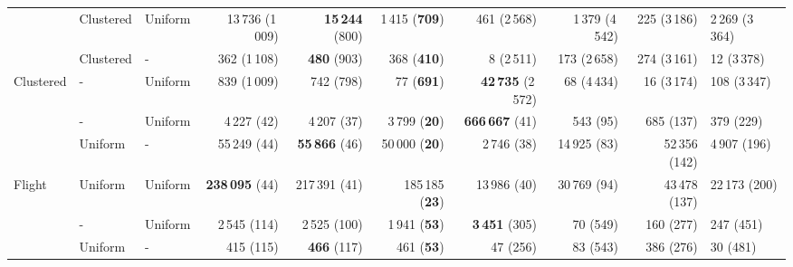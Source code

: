 \begin{tabular}[t]{lllrrrrrrl}
 & Clustered & Uniform & 13\,736 {\footnotesize(1\,009)} & \textbf{15\,244} {\footnotesize(800)} & 1\,415 {\footnotesize(\textbf{709})} & 461 {\footnotesize(2\,568)} & 1\,379 {\footnotesize(4\,542)} & 225 {\footnotesize(3\,186)} & 2\,269 {\footnotesize(3\,364)}\\

 & Clustered & - & 362 {\footnotesize(1\,108)} & \textbf{480} {\footnotesize(903)} & 368 {\footnotesize(\textbf{410})} & 8 {\footnotesize(2\,511)} & 173 {\footnotesize(2\,658)} & 274 {\footnotesize(3\,161)} & 12 {\footnotesize(3\,378)}\\

\multirow{-5}{*}{\raggedright\arraybackslash Clustered} & - & Uniform & 839 {\footnotesize(1\,009)} & 742 {\footnotesize(798)} & 77 {\footnotesize(\textbf{691})} & \textbf{42\,735} {\footnotesize(2\,572)} & 68 {\footnotesize(4\,434)} & 16 {\footnotesize(3\,174)} & 108 {\footnotesize(3\,347)}\\
\cmidrule{1-10}
 & - & Uniform & 4\,227 {\footnotesize(42)} & 4\,207 {\footnotesize(37)} & 3\,799 {\footnotesize(\textbf{20})} & \textbf{666\,667} {\footnotesize(41)} & 543 {\footnotesize(95)} & 685 {\footnotesize(137)} & 379 {\footnotesize(229)}\\

 & Uniform & - & 55\,249 {\footnotesize(44)} & \textbf{55\,866} {\footnotesize(46)} & 50\,000 {\footnotesize(\textbf{20})} & 2\,746 {\footnotesize(38)} & 14\,925 {\footnotesize(83)} & 52\,356 {\footnotesize(142)} & 4\,907 {\footnotesize(196)}\\

\multirow{-3}{*}{\raggedright\arraybackslash Flight} & Uniform & Uniform & \textbf{238\,095} {\footnotesize(44)} & 217\,391 {\footnotesize(41)} & 185\,185 {\footnotesize(\textbf{23})} & 13\,986 {\footnotesize(40)} & 30\,769 {\footnotesize(94)} & 43\,478 {\footnotesize(137)} & 22\,173 {\footnotesize(200)}\\
\cmidrule{1-10}
 & - & Uniform & 2\,545 {\footnotesize(114)} & 2\,525 {\footnotesize(100)} & 1\,941 {\footnotesize(\textbf{53})} & \textbf{3\,451} {\footnotesize(305)} & 70 {\footnotesize(549)} & 160 {\footnotesize(277)} & 247 {\footnotesize(451)}\\

 & Uniform & - & 415 {\footnotesize(115)} & \textbf{466} {\footnotesize(117)} & 461 {\footnotesize(\textbf{53})} & 47 {\footnotesize(256)} & 83 {\footnotesize(543)} & 386 {\footnotesize(276)} & 30 {\footnotesize(481)}\\


\end{tabular}
